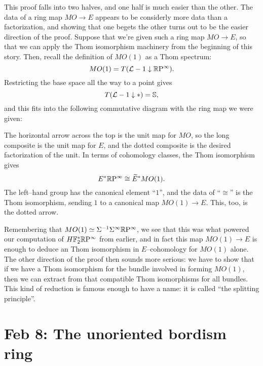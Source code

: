 \noindent This proof falls into two halves, and one half is much easier than the other.  The data of a ring map $MO \to E$ appears to be considerly more data than a factorization, and showing that one begets the other turns out to be the easier direction of the proof.  Suppose that we're given such a ring map $MO \to E$, so that we can apply the Thom isomorphism machinery from the beginning of this story.  Then, recall the definition of $MO(1)$ as a Thom spectrum: \[MO(1) = T(\mathcal{L} - 1 \downarrow \mathbb R\mathrm P^\infty).\]  Restricting the base space all the way to a point gives \[T(\mathcal{L} - 1 \downarrow *) = \mathbb S,\] and this fits into the following commutative diagram with the ring map we were given:
\begin{center}
\end{center}
The horizontal arrow across the top is the unit map for $MO$, so the long composite is the unit map for $E$, and the dotted composite is the desired factorization of the unit.  In terms of cohomology classes, the Thom isomorphism gives \[E^* \mathbb R\mathrm P^\infty \cong \widetilde E^* MO(1).\]  The left--hand group has the canonical element ``$1$'', and the data of ``$\cong$'' is the Thom isomorphism, sending $1$ to a canonical map $MO(1) \to E$.  This, too, is the dotted arrow.

Remembering that $MO(1) \simeq \Sigma^{-1} \Sigma^\infty \mathbb R\mathrm P^\infty$, we see that this was what powered our computation of $H\mathbb F_2^* \mathbb R\mathrm P^\infty$ from earlier, and in fact this map $MO(1) \to E$ is enough to deduce an Thom isomorphism in $E$--cohomology for $MO(1)$ alone.  The other direction of the proof then sounds more serious: we have to show that if we have a Thom isomorphism for the bundle involved in forming $MO(1)$, then we can extract from that compatible Thom isomorphisms for all bundles.  This kind of reduction is famous enough to have a name: it is called ``the splitting principle''.







\section{Feb 8: The unoriented bordism ring}

